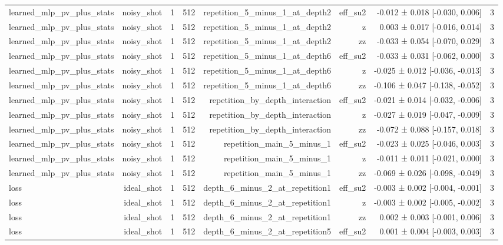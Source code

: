\begin{table}
\begin{tabular}{lrrrrrrr}
learned\_mlp\_pv\_plus\_stats & noisy\_shot & 1 & 512 & repetition\_5\_minus\_1\_at\_depth2 & eff\_su2 & -0.012 ± 0.018 [-0.030, 0.006] & 3 \\
learned\_mlp\_pv\_plus\_stats & noisy\_shot & 1 & 512 & repetition\_5\_minus\_1\_at\_depth2 & z & 0.003 ± 0.017 [-0.016, 0.014] & 3 \\
learned\_mlp\_pv\_plus\_stats & noisy\_shot & 1 & 512 & repetition\_5\_minus\_1\_at\_depth2 & zz & -0.033 ± 0.054 [-0.070, 0.029] & 3 \\
learned\_mlp\_pv\_plus\_stats & noisy\_shot & 1 & 512 & repetition\_5\_minus\_1\_at\_depth6 & eff\_su2 & -0.033 ± 0.031 [-0.062, 0.000] & 3 \\
learned\_mlp\_pv\_plus\_stats & noisy\_shot & 1 & 512 & repetition\_5\_minus\_1\_at\_depth6 & z & -0.025 ± 0.012 [-0.036, -0.013] & 3 \\
learned\_mlp\_pv\_plus\_stats & noisy\_shot & 1 & 512 & repetition\_5\_minus\_1\_at\_depth6 & zz & -0.106 ± 0.047 [-0.138, -0.052] & 3 \\
learned\_mlp\_pv\_plus\_stats & noisy\_shot & 1 & 512 & repetition\_by\_depth\_interaction & eff\_su2 & -0.021 ± 0.014 [-0.032, -0.006] & 3 \\
learned\_mlp\_pv\_plus\_stats & noisy\_shot & 1 & 512 & repetition\_by\_depth\_interaction & z & -0.027 ± 0.019 [-0.047, -0.009] & 3 \\
learned\_mlp\_pv\_plus\_stats & noisy\_shot & 1 & 512 & repetition\_by\_depth\_interaction & zz & -0.072 ± 0.088 [-0.157, 0.018] & 3 \\
learned\_mlp\_pv\_plus\_stats & noisy\_shot & 1 & 512 & repetition\_main\_5\_minus\_1 & eff\_su2 & -0.023 ± 0.025 [-0.046, 0.003] & 3 \\
learned\_mlp\_pv\_plus\_stats & noisy\_shot & 1 & 512 & repetition\_main\_5\_minus\_1 & z & -0.011 ± 0.011 [-0.021, 0.000] & 3 \\
learned\_mlp\_pv\_plus\_stats & noisy\_shot & 1 & 512 & repetition\_main\_5\_minus\_1 & zz & -0.069 ± 0.026 [-0.098, -0.049] & 3 \\
loss & ideal\_shot & 1 & 512 & depth\_6\_minus\_2\_at\_repetition1 & eff\_su2 & -0.003 ± 0.002 [-0.004, -0.001] & 3 \\
loss & ideal\_shot & 1 & 512 & depth\_6\_minus\_2\_at\_repetition1 & z & -0.003 ± 0.002 [-0.005, -0.002] & 3 \\
loss & ideal\_shot & 1 & 512 & depth\_6\_minus\_2\_at\_repetition1 & zz & 0.002 ± 0.003 [-0.001, 0.006] & 3 \\
loss & ideal\_shot & 1 & 512 & depth\_6\_minus\_2\_at\_repetition5 & eff\_su2 & 0.001 ± 0.004 [-0.003, 0.003] & 3 \\

\end{tabular}
\end{table}
